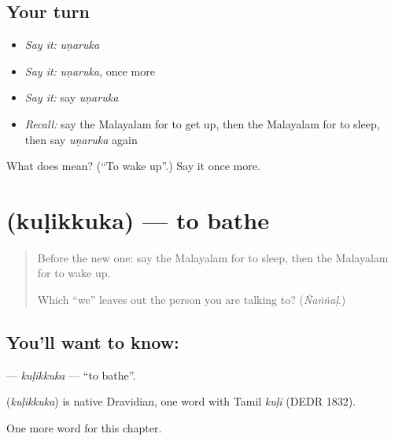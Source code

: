 \subsection*{Your turn}
\begin{itemize}
\raggedright
  \item \emph{Say it:} \emph{uṇaruka}
  \item \emph{Say it:} \emph{uṇaruka}, once more
  \item \emph{Say it:} say \emph{uṇaruka}
  \item \emph{Recall:} say the Malayalam for to get up, then the Malayalam for to sleep, then say \emph{uṇaruka} again
\end{itemize}

\begin{tcolorbox}[breakable,colback=teal!4,colframe=teal!35!black,title={Before you move on}]
What does  mean? (\textquotedblleft{}To wake up\textquotedblright{}.) Say it once more.
\end{tcolorbox}
\section[\texorpdfstring{\ml{കുളിക്കുക} (kuḷikkuka)}{കുളിക്കുക (kuḷikkuka)}]{ (kuḷikkuka) — to bathe}

\label{lesson:ML-C171-kulikkuka}



\begin{quote}
Before the new one: say the Malayalam for to sleep, then the Malayalam for to wake up.

Which \textquotedblleft{}we\textquotedblright{} leaves out the person you are talking to? (\emph{Ñaṅṅaḷ}.)
\end{quote}

\subsection*{You'll want to know: }
\textbf{} — \emph{kuḷikkuka} — \textquotedblleft{}to bathe\textquotedblright{}.

\begin{cousinweb}
\textbf{} (\emph{kuḷikkuka}) is native Dravidian, one word with Tamil \emph{kuḷi} (DEDR 1832).
\end{cousinweb}

\begin{grammarlens}[title={What you've built}]
One more word for this chapter.
\end{grammarlens}

